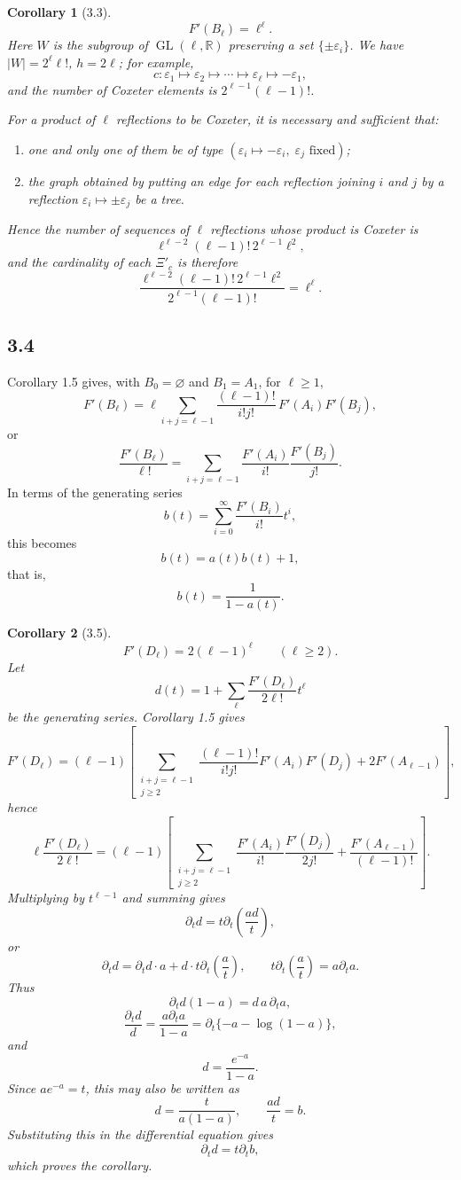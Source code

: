 \documentclass[11pt]{article}
\newcommand{\GL}{\operatorname{GL}}
\theoremstyle{plainen}
\newtheorem*{corollaryx}{Corollary}
\begin{document}
\begin{corollaryx}[3.3]
\[
 F'(B_\ell)=\ell^\ell.
\]
Here $W$ is the subgroup of $\GL(\ell,\mathbb R)$ preserving a set $\{\pm\varepsilon_i\}$. We have $|W|=2^\ell\ell!$, $h=2\ell$; for example,
\[
 c:\varepsilon_1\mapsto\varepsilon_2\mapsto\cdots\mapsto\varepsilon_\ell\mapsto-\varepsilon_1,
\]
and the number of Coxeter elements is $2^{\ell-1}(\ell-1)!$.

For a product of $\ell$ reflections to be Coxeter, it is necessary and sufficient that:
\begin{enumerate}[label=(\alph*),leftmargin=2.2em]
\item one and only one of them be of type $(\varepsilon_i\mapsto-\varepsilon_i,\;\varepsilon_j\text{ fixed})$;
\item the graph obtained by putting an edge for each reflection joining $i$ and $j$ by a reflection $\varepsilon_i\mapsto\pm\varepsilon_j$ be a tree.
\end{enumerate}
Hence the number of sequences of $\ell$ reflections whose product is Coxeter is
\[
 \ell^{\ell-2}(\ell-1)!\,2^{\ell-1}\ell^2,
\]
and the cardinality of each $\Xi'_c$ is therefore
\[
 \frac{\ell^{\ell-2}(\ell-1)!\,2^{\ell-1}\ell^2}{2^{\ell-1}(\ell-1)!}=\ell^\ell.
\]
\end{corollaryx}

\subsection*{3.4}
Corollary 1.5 gives, with $B_0=\varnothing$ and $B_1=A_1$, for $\ell\ge1$,
\[
 F'(B_\ell)=\ell\sum_{i+j=\ell-1}\frac{(\ell-1)!}{i!j!}\,F'(A_i)F'(B_j),
\]
or
\[
 \frac{F'(B_\ell)}{\ell!}=\sum_{i+j=\ell-1}\frac{F'(A_i)}{i!}\frac{F'(B_j)}{j!}.
\]
In terms of the generating series
\[
 b(t)=\sum_{i=0}^\infty\frac{F'(B_i)}{i!}t^i,
\]
this becomes
\[
 b(t)=a(t)b(t)+1,
\]
that is,
\[
 b(t)=\frac1{1-a(t)}.
\]

\begin{corollaryx}[3.5]
\[
 F'(D_\ell)=2(\ell-1)^\ell\qquad (\ell\ge2).
\]
Let
\[
 d(t)=1+\sum_\ell\frac{F'(D_\ell)}{2\ell!}t^\ell
\]
be the generating series. Corollary 1.5 gives
\[
F'(D_\ell)=(\ell-1)\left[
\sum_{\substack{i+j=\ell-1\\ j\ge2}}
\frac{(\ell-1)!}{i!j!}F'(A_i)F'(D_j)+2F'(A_{\ell-1})\right],
\]
hence
\[
\ell\frac{F'(D_\ell)}{2\ell!}=(\ell-1)\left[
\sum_{\substack{i+j=\ell-1\\ j\ge2}}
\frac{F'(A_i)}{i!}\frac{F'(D_j)}{2j!}
+\frac{F'(A_{\ell-1})}{(\ell-1)!}\right].
\]
Multiplying by $t^{\ell-1}$ and summing gives
\[
 \partial_t d=t\partial_t\left(\frac{ad}{t}\right),
\]
or
\[
\partial_t d=\partial_t d\cdot a+d\cdot t\partial_t\left(\frac{a}{t}\right),\qquad
 t\partial_t\left(\frac{a}{t}\right)=a\partial_t a.
\]
Thus
\[
 \partial_t d(1-a)=d\,a\,\partial_t a,
\]
\[
 \frac{\partial_t d}{d}=\frac{a\partial_t a}{1-a}=\partial_t\{-a-\log(1-a)\},
\]
and
\[
 d=\frac{e^{-a}}{1-a}.
\]
Since $ae^{-a}=t$, this may also be written as
\[
 d=\frac{t}{a(1-a)},\qquad \frac{ad}{t}=b.
\]
Substituting this in the differential equation gives
\[
 \partial_t d=t\partial_t b,
\]
which proves the corollary.
\end{corollaryx}
\end{document}
